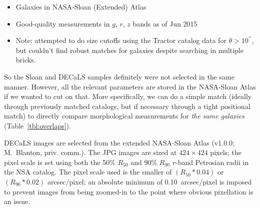\documentclass[iop,apj,tighten]{emulateapj}
\begin{document}
\begin{itemize}
    \item Galaxies in NASA-Sloan (Extended) Atlas
    \item Good-quality measurements in $g$, $r$, $z$ bands as of Jun 2015
    \item Note: attempted to do size cutoffs using the Tractor catalog data for $\theta > 10^{\prime\prime}$, but couldn't find robust matches for galaxies despite searching in multiple bricks.
\end{itemize}

So the Sloan and DECaLS samples definitely were not selected in the same manner. However, all the relevant parameters are stored in the NASA-Sloan Atlas if we wanted to cut on that. More specifically, we can do a simple match (ideally through previously matched catalogs, but if necessary through a tight positional match) to directly compare morphological measurements for \emph{the same galaxies} (Table~\ref{tbl:overlaps}).

DECaLS images are selected from the extended NASA-Sloan Atlas (v1.0.0; M.~Blanton, priv. comm.). The JPG images are sized at $424\times424$ pixels; the pixel scale is set using both the 50\% $R_{50}$ and 90\% $R_{90}$ $r$-band Petrosian radii in the NSA catalog. The pixel scale used is the smaller of $(R_{50}*0.04)$ or $(R_{90}*0.02)$ arcsec/pixel; an absolute minimum of 0.10~arcsec/pixel is imposed to prevent images from being zoomed-in to the point where obvious pixellation is an issue.
\end{document}
